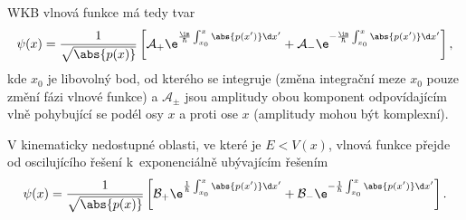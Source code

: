 WKB vlnová funkce má tedy tvar
\begin{equation}
    \psi(x)=\frac{1}{\sqrt{\abs{p(x)}}}\left[\mathcal{A}_{+}\e^{\frac{\im}{\hbar}\int_{x_{0}}^{x}\abs{p(x')}\d x'}+\mathcal{A}_{-}\e^{-\frac{\im}{\hbar}\int_{x_{0}}^{x}\abs{p(x')}\d x'}\right],
\end{equation}
kde $x_{0}$ je libovolný bod, od kterého se integruje (změna integrační meze $x_0$ pouze změní fázi vlnové funkce) a $\mathcal{A}_{\pm}$ jsou amplitudy obou komponent odpovídajícím vlně pohybující se podél osy $x$ a proti ose $x$ (amplitudy mohou být komplexní).

V kinematicky nedostupné oblasti, ve které je $E<V(x)$, vlnová funkce přejde od oscilujícího řešení k~exponenciálně ubývajícím řešením
\begin{equation}
    \psi(x)=\frac{1}{\sqrt{\abs{p(x)}}}\left[\mathcal{B}_{+}\e^{\frac{1}{\hbar}\int_{x_{0}}^{x}\abs{p(x')}\d x'}+\mathcal{B}_{-}\e^{-\frac{1}{\hbar}\int_{x_{0}}^{x}\abs{p(x')}\d x'}\right].
\end{equation}